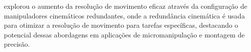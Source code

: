 

\cite{hammond2011} explorou o aumento da resolução de movimento eficaz através da configuração de manipuladores cinemáticos
redundantes, onde a redundância cinemática é usada para otimizar a resolução de movimento para tarefas específicas, destacando o potencial dessas
abordagens em aplicações de micromanipulação e montagem de precisão.

